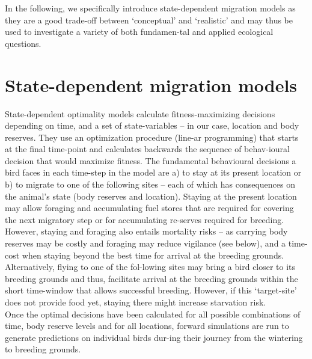 \documentclass[
]{book}
\begin{document}
In the following, we specifically introduce state-dependent migration models as they are a good trade-off between `conceptual' and `realistic' and may thus be used to investigate a variety of both fundamen-tal and applied ecological questions.

\hypertarget{state-dependent-migration-models}{%
\section{State-dependent migration models}\label{state-dependent-migration-models}}

State-dependent optimality models calculate fitness-maximizing decisions depending on time, and a set of state-variables -- in our case, location and body reserves. They use an optimization procedure (line-ar programming) that starts at the final time-point and calculates backwards the sequence of behav-ioural decision that would maximize fitness.
The fundamental behavioural decisions a bird faces in each time-step in the model are a) to stay at its present location or b) to migrate to one of the following sites -- each of which has consequences on the animal's state (body reserves and location). Staying at the present location may allow foraging and accumulating fuel stores that are required for covering the next migratory step or for accumulating re-serves required for breeding. However, staying and foraging also entails mortality risks -- as carrying body reserves may be costly and foraging may reduce vigilance (see below), and a time-cost when staying beyond the best time for arrival at the breeding grounds. Alternatively, flying to one of the fol-lowing sites may bring a bird closer to its breeding grounds and thus, facilitate arrival at the breeding grounds within the short time-window that allows successful breeding. However, if this `target-site' does not provide food yet, staying there might increase starvation risk.\\
Once the optimal decisions have been calculated for all possible combinations of time, body reserve levels and for all locations, forward simulations are run to generate predictions on individual birds dur-ing their journey from the wintering to breeding grounds.
\end{document}
